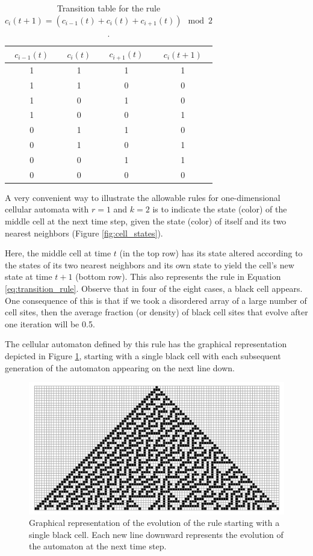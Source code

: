 \documentclass[9pt,a4paper,twoside]{tau-class/tau}
\begin{document}
    \begin{table}[H]
        \centering
        \begin{tabular}{cccc}
            \toprule
            $c_{i-1}(t)$ & $c_i(t)$ & $c_{i+1}(t)$ & $c_i(t + 1)$ \\
            \midrule
            1 & 1 & 1 & 1 \\
            1 & 1 & 0 & 0 \\
            1 & 0 & 1 & 0 \\
            1 & 0 & 0 & 1 \\
            0 & 1 & 1 & 0 \\
            0 & 1 & 0 & 1 \\
            0 & 0 & 1 & 1 \\
            0 & 0 & 0 & 0 \\
            \bottomrule
        \end{tabular}
        \caption{Transition table for the rule \( c_i(t + 1) = (c_{i-1}(t) + c_i(t) + c_{i+1}(t)) \mod 2 \).}
        \label{tab:transition_table}
    \end{table}

    A very convenient way to illustrate the allowable rules for one-dimensional cellular automata with \( r = 1 \) and \( k = 2 \) is to indicate the state (color) of the middle cell at the next time step, given the state (color) of itself and its two nearest neighbors (Figure \ref{fig:cell_states}).

    Here, the middle cell at time \( t \) (in the top row) has its state altered according to the states of its two nearest neighbors and its own state to yield the cell’s new state at time \( t + 1 \) (bottom row). This also represents the rule in Equation \ref{eq:transition_rule}. Observe that in four of the eight cases, a black cell appears. One consequence of this is that if we took a disordered array of a large number of cell sites, then the average fraction (or density) of black cell sites that evolve after one iteration will be 0.5.

    The cellular automaton defined by this rule has the graphical representation depicted in Figure \ref{fig:rule_graphic}, starting with a single black cell with each subsequent generation of the automaton appearing on the next line down.
    \begin{figure}[H]
        \centering
        \includegraphics[width=0.75\columnwidth]{figures/rule30.png}
         \caption{Graphical representation of the evolution of the rule starting with a single black cell. Each new line downward represents the evolution of the automaton at the next time step.} 
        \label{fig:rule_graphic}
    \end{figure}
\end{document}
